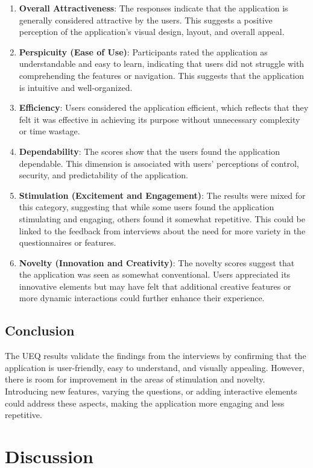\begin{enumerate}
    \item \textbf{Overall Attractiveness}: The responses indicate that the application is generally considered attractive by the users. This suggests a positive perception of the application's visual design, layout, and overall appeal.
    \item \textbf{Perspicuity (Ease of Use)}: Participants rated the application as understandable and easy to learn, indicating that users did not struggle with comprehending the features or navigation. This suggests that the application is intuitive and well-organized.
    \item \textbf{Efficiency}: Users considered the application efficient, which reflects that they felt it was effective in achieving its purpose without unnecessary complexity or time wastage.
    \item \textbf{Dependability}: The scores show that the users found the application dependable. This dimension is associated with users' perceptions of control, security, and predictability of the application.
    \item \textbf{Stimulation (Excitement and Engagement)}: The results were mixed for this category, suggesting that while some users found the application stimulating and engaging, others found it somewhat repetitive. This could be linked to the feedback from interviews about the need for more variety in the questionnaires or features.
    \item \textbf{Novelty (Innovation and Creativity)}: The novelty scores suggest that the application was seen as somewhat conventional. Users appreciated its innovative elements but may have felt that additional creative features or more dynamic interactions could further enhance their experience.
\end{enumerate}

\subsection{Conclusion}
The UEQ results validate the findings from the interviews by confirming that the application is user-friendly, easy to understand, and visually appealing. However, there is room for improvement in the areas of stimulation and novelty. Introducing new features, varying the questions, or adding interactive elements could address these aspects, making the application more engaging and less repetitive.

\section{Discussion}

